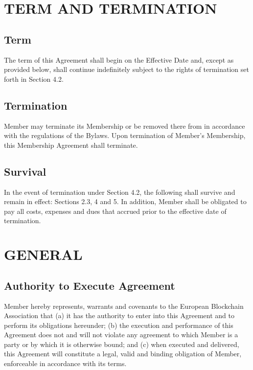 \documentclass{article}
\begin{document}
\section{TERM AND TERMINATION}

\subsection{Term}

The term of this Agreement shall begin on the Effective Date and, except as provided below, shall continue indefinitely subject to the rights of termination set forth in Section 4.2.

\subsection{Termination}

Member may terminate its Membership or be removed there from in accordance with the regulations of the Bylaws. Upon termination of Member’s Membership, this Membership Agreement shall terminate.

\subsection{Survival}

In the event of termination under Section 4.2, the following shall survive and remain in effect: Sections 2.3, 4 and 5. In addition, Member shall be obligated to pay all costs, expenses and dues that accrued prior to the effective date of termination.

\section{GENERAL}

\subsection{Authority to Execute Agreement}

Member hereby represents, warrants and covenants to the European Blockchain Association that (a) it has the authority to enter into this Agreement and to perform its obligations hereunder; (b) the execution and performance of this Agreement does not and will not violate any agreement to which Member is a party or by which it is otherwise bound; and (c) when executed and delivered, this Agreement will constitute a legal, valid and binding obligation of Member, enforceable in accordance with its terms.
\end{document}
